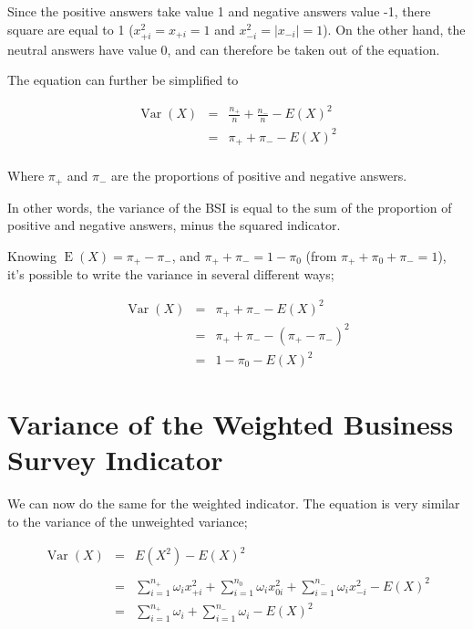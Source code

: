 \documentclass[12pt,a4paper,oneside]{book}
\DeclareMathOperator{\Var}{Var}
\DeclareMathOperator{\E}{E}
\begin{document}
Since the positive answers take value 1 and negative answers value -1, there square are equal to 1 ($x_{+i}^2 = x_{+i} = 1$ and $x_{-i}^2 = |x_{-i}| = 1$). 
On the other hand, the neutral answers have value 0, and can therefore be taken out of the equation.

The equation can further be simplified to

\begin{eqnarray}
    \Var(X) &=&  \frac{n_+}{n}  +  \frac{n_-}{n}  - E(X)^2 \\
    &=& \pi_+ + \pi_- - E ( X )^2 \label{var1} \\ \nonumber
\end{eqnarray}

Where $\pi_+$ and $\pi_-$ are the proportions of positive and negative answers.

In other words, the variance of the BSI is equal to the sum of the proportion of positive and negative answers, minus the squared indicator.

Knowing $\E(X)=\pi_+ - \pi_-$, and $\pi_+ + \pi_- = 1 - \pi_0$ (from $\pi_+ + \pi_0 + \pi_- = 1$),
it's possible to write the variance in several different ways;


\begin{eqnarray}
\Var(X) &=& \pi_+ + \pi_- - E ( X )^2  \nonumber \\
        &=& \pi_+ + \pi_- - ( \pi_+ - \pi_- )^2 \label{eq:var2} \\
        &=& 1 - \pi_0 - E(X)^2 \label{eq:var3}
\end{eqnarray}




\section{Variance of the Weighted Business Survey Indicator}

We can now do the same for the weighted indicator. The equation is very similar to the variance of the unweighted variance;



\begin{eqnarray}
\Var(X) &=&  E\left( X^2\right) - E\left( X\right)^2 \nonumber \\ \nonumber \\
    &=& \sum_{i=1}^{n_+} \omega_i x_{+i}^2 + \sum_{i=1}^{n_0} \omega_i x_{0i}^2  + \sum_{i=1}^{n_-} \omega_i x_{-i}^2 - E(X)^2 \\
    &=& \sum_{i=1}^{n_+} \omega_i + \sum_{i=1}^{n_-} \omega_i - E(X)^2 \nonumber \\
\end{eqnarray}
\end{document}
